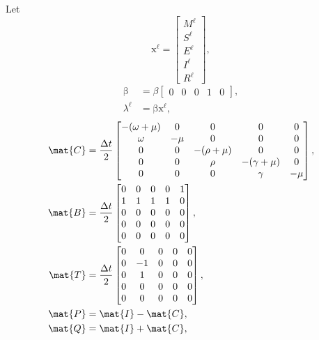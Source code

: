 \documentclass{jpmarticle}
\renewcommand{\vec}[1]{\boldsymbol{\mathrm{#1}}}
\begin{document}
Let
\begin{equation}
  \vec{x}^{\ell} =
  \begin{bmatrix}
    M^{\ell} \\ S^{\ell} \\ E^{\ell} \\ I^{\ell} \\ R^{\ell}
  \end{bmatrix},
\end{equation}
\begin{equation}
  \begin{split}
    \vec{\beta} &=
    \beta
    \begin{bmatrix}
      0 & 0 & 0 & 1 & 0
    \end{bmatrix},
    \\
    \lambda^{\ell} &=
    \vec{\beta} \vec{x}^{\ell},
  \end{split}
\end{equation}
\begin{equation}
  \begin{split}
    \mat{C} &=
    \frac{\Delta t}{2}
    \begin{bmatrix}
      - (\omega + \mu) & 0 & 0 & 0 & 0
      \\
      \omega & - \mu & 0 & 0 & 0
      \\
      0 & 0 & - (\rho + \mu) & 0 & 0 \\
      0 & 0 & \rho & - (\gamma + \mu) & 0
      \\
      0 & 0 & 0 & \gamma & - \mu
    \end{bmatrix},
    \\
    \mat{B} &=
    \frac{\Delta t}{2}
    \begin{bmatrix}
      0 & 0 & 0 & 0 & 1
      \\
      1 & 1 & 1 & 1 & 0
      \\
      0 & 0 & 0 & 0 & 0
      \\
      0 & 0 & 0 & 0 & 0
      \\
      0 & 0 & 0 & 0 & 0
    \end{bmatrix},
    \\
    \mat{T} &=
    \frac{\Delta t}{2}
    \begin{bmatrix}
      0 & 0 & 0 & 0 & 0
      \\
      0 & - 1 & 0 & 0 & 0
      \\
      0 & 1 & 0 & 0 & 0
      \\
      0 & 0 & 0 & 0 & 0
      \\
      0 & 0 & 0 & 0 & 0
    \end{bmatrix},
    \\
    \mat{P} &= \mat{I} - \mat{C},
    \\
    \mat{Q} &= \mat{I} + \mat{C},
  \end{split}
\end{equation}
\end{document}
